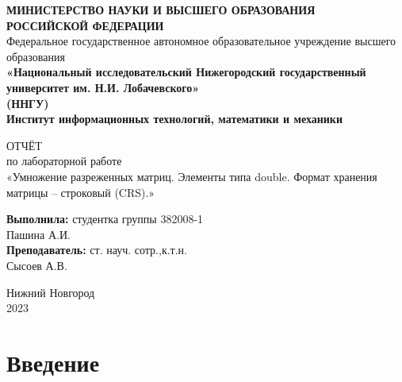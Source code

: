 \documentclass[14pt, russian]{extarticle}
\title{}
\author{}
\date{}
\begin{document}
	\begin{titlepage}
		\begin{center}
			{\bfseries МИНИСТЕРСТВО НАУКИ И ВЫСШЕГО ОБРАЗОВАНИЯ \\
				РОССИЙСКОЙ ФЕДЕРАЦИИ}
			\\
			Федеральное государственное автономное образовательное учреждение высшего образования 
			\\
			{\bfseries «Национальный исследовательский Нижегородский государственный университет им. Н.И. Лобачевского»\\(ННГУ)
				\\Институт информационных технологий, математики и механики} \\
		\end{center}
		
		\vspace{8em}
		
		\begin{center}
			ОТЧЁТ \\ по лабораторной работе \\
			«Умножение разреженных матриц. Элементы типа double. Формат хранения матрицы – строковый (CRS).»
		\end{center}
		
		\vspace{5em}
		
		
		\begin{flushright}
			{\bfseries Выполнила:} студентка группы 382008-1\\Пашина А.И.\\ 
			{\bfseries Преподаватель:} ст. науч. сотр.,к.т.н.\\Сысоев А.В.\\
		\end{flushright}
		
		
		\vspace{\fill}
		
		\begin{center}
			Нижний Новгород\\2023
		\end{center}
		
	\end{titlepage}
	
	\tableofcontents
	\thispagestyle{empty}
	\newpage
	
	\pagestyle{plain}
	\setcounter{page}{3}

	\section{Введение}
    
\end{document}
